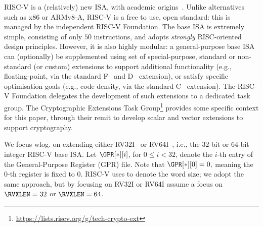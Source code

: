 
RISC-V is a (relatively) new ISA, with academic origins~\cite{riscv:1,riscv:2}.
Unlike alternatives such as x86 or ARMv8-A, RISC-V is a free to use, 
open standard: this is managed by the independent RISC-V Foundation.
The base ISA is extremely simple, consisting of only $50$ instructions,
and adopts {\em strongly} RISC-oriented design principles.  However, it
is also highly modular: a general-purpose base ISA can (optionally) be
supplemented using set of special-purpose, standard or non-standard (or
custom) extensions to
support additional functionality 
(e.g., floating-point, 
       via the 
       standard F~\cite[Section 11]{RV:ISA:I:19}
                and
                D~\cite[Section 12]{RV:ISA:I:19}
       extension),
or 
satisfy specific optimisation goals
(e.g., code density, 
       via the 
       standard C~\cite[Section 16]{RV:ISA:I:19}
       extension).
The RISC-V Foundation delegates the development of such extensions to a
dedicated task group.  The Cryptographic Extensions Task Group\footnote{
  \url{https://lists.riscv.org/g/tech-crypto-ext}
} provides some specific context for this paper, through their remit to 
develop scalar and vector extensions to support cryptography.

We focus wlog. on extending either
RV32I~\cite[Section 2]{RV:ISA:I:19}
or
RV64I~\cite[Section 5]{RV:ISA:I:19},
i.e., the
$32$-bit 
or
$64$-bit 
integer RISC-V base ISA.
Let $\GPR[*][ i ]$, for $0 \leq i < 32$, denote the $i$-th entry of the 
General-Purpose Register (GPR) file.  Note that 
$
\GPR[*][ 0 ] = 0 ,
$
meaning the $0$-th register is fixed to $0$.
RISC-V uses \RVXLEN to denote the word size; we adopt the same approach, 
but by focusing on 
RV32I 
or
RV64I 
assume a focus on 
$\RVXLEN = 32$
or
$\RVXLEN = 64$.

